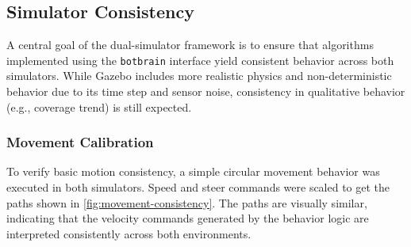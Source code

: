 \subsection{Simulator Consistency}
\label{sec:simulator-consistency}
A central goal of the dual-simulator framework is to ensure that algorithms implemented using the \texttt{botbrain} interface yield consistent behavior across both simulators. While Gazebo includes more realistic physics and non-deterministic behavior due to its time step and sensor noise, consistency in qualitative behavior (e.g., coverage trend) is still expected.

\subsubsection{Movement Calibration}
To verify basic motion consistency, a simple circular movement behavior was executed in both simulators. Speed and steer commands were scaled to get the paths shown in \cref{fig:movement-consistency}. The paths are visually similar, indicating that the velocity commands generated by the behavior logic are interpreted consistently across both environments. 

